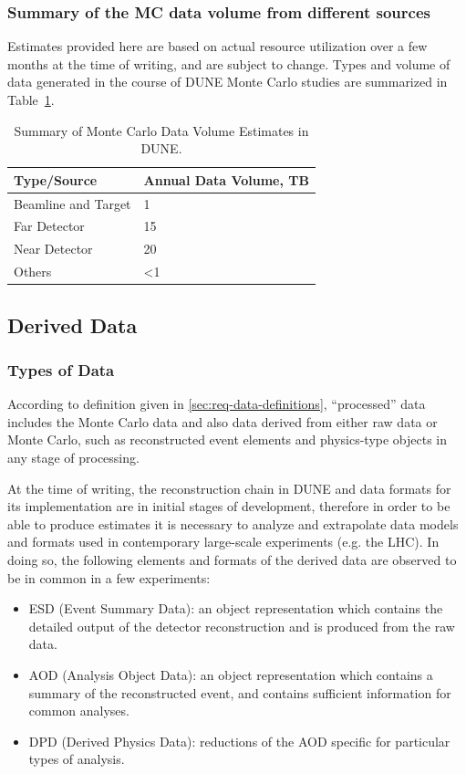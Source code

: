\subsubsection{Summary of the MC data volume from different sources}
Estimates provided here are based on actual resource utilization over a few months at the time of writing, and are subject
to change. Types and volume of data generated in the course of DUNE Monte Carlo studies are summarized in Table~\ref{tab:mc-data}.
\begin{table}[ht!]
\centering
\begin{tabular}{| p{1.8in} | p{2.1in} |}		\hline		
\textbf{Type/Source} & \textbf{Annual Data Volume, TB}\\ \hline
Beamline and Target & 1 \\ \hline
Far Detector & 15 \\ \hline
Near Detector & 20 \\ \hline
Others & <1 \\ \hline
\end{tabular}
\caption{Summary of Monte Carlo Data Volume Estimates in DUNE.}
\label{tab:mc-data}
\end{table}

\subsection{Derived Data}
\label{sec:derived-data}
\subsubsection{Types of Data}
According to definition given in \ref{sec:req-data-definitions}, ``processed'' data includes the Monte Carlo data and
also data derived from either raw data or Monte Carlo, such as reconstructed event elements and physics-type objects
in any stage of processing.

At the time of writing, the reconstruction chain in DUNE and data formats for its implementation are in initial
stages of development, therefore in order to be able to produce estimates it is necessary to analyze and extrapolate
data models and formats used in contemporary large-scale experiments (e.g. the LHC). In doing so, the following elements
and formats of the derived data are observed to be in common in a few experiments:

\begin{itemize}

\item ESD (Event Summary Data): an object representation which contains the detailed output of the detector reconstruction and is
produced from the raw data.

\item AOD (Analysis Object Data): an object representation which contains a summary of the reconstructed event,
and contains sufficient information for common analyses.

\item DPD (Derived Physics Data): reductions of the AOD specific for particular types of analysis.

\end{itemize}

